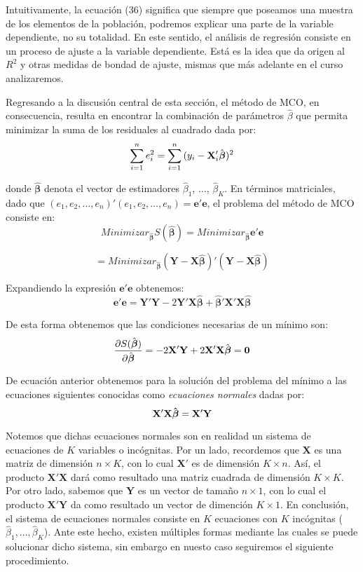 \documentclass[
  a4paper,
]{article}
\begin{document}
Intuitivamente, la ecuación (36) significa que siempre que poseamos una
muestra de los elementos de la población, podremos explicar una parte de
la variable dependiente, no su totalidad. En este sentido, el análisis
de regresión consiste en un proceso de ajuste a la variable dependiente.
Está es la idea que da origen al \(R^2\) y otras medidas de bondad de
ajuste, mismas que más adelante en el curso analizaremos.

Regresando a la discusión central de esta sección, el método de MCO, en
consecuencia, resulta en encontrar la combinación de parámetros
\(\hat\beta\) que permita minimizar la suma de los residuales al
cuadrado dada por: \[
\sum^{n}_{i=1}{e^2_i} = \sum^{n}_{i=1}{(y_i - {\bf X}'_i\hat{\boldsymbol{\beta}})^2}
\]

donde \(\hat{\boldsymbol{\beta}}\) denota el vector de estimadores
\(\hat{\beta}_1\), \(\ldots\), \(\hat{\beta}_K\). En términos
matriciales, dado que
\((e_1, e_2, \ldots, e_n)'(e_1, e_2, \ldots, e_n) = {\mathbf{e'e}}\), el
problema del método de MCO consiste en: \[
Minimizar_{\hat{\boldsymbol \beta}} S(\hat{\boldsymbol \beta}) = Minimizar_{\hat{\boldsymbol \beta}} \mathbf{e'e} 
\]

\[
= Minimizar_{\hat{\boldsymbol \beta}} (\mathbf{Y}-\mathbf{X}\hat{\boldsymbol \beta})'(\mathbf{Y}-\mathbf{X}\hat{\boldsymbol \beta})
\]

Expandiendo la expresión \(\mathbf{e'e}\) obtenemos: \[
\mathbf{e'e} = \mathbf{Y'Y} - 2 \mathbf{Y'X} \hat{\boldsymbol \beta} + \hat{\boldsymbol \beta}' \mathbf{X'X}\hat{\boldsymbol \beta}
\]

De esta forma obtenemos que las condiciones necesarias de un mínimo son:
\[
\frac{\partial S(\hat{\boldsymbol \beta})}{\partial \hat{\boldsymbol \beta}} = -2{\bf{X'Y}} + 2{\bf{X'X}} \hat{\boldsymbol{\beta}} = \bf{0}
\]

De ecuación anterior obtenemos para la solución del problema del mínimo
a las ecuaciones siguientes conocidas como \textit{ecuaciones normales}
dadas por: \[
\bf{X'X}\hat{\boldsymbol \beta} = \bf{X'Y}
\]

Notemos que dichas ecuaciones normales son en realidad un sistema de
ecuaciones de \(K\) variables o incógnitas. Por un lado, recordemos que
\(\mathbf X\) es una matriz de dimensión \(n \times K\), con lo cual
\(\mathbf X'\) es de dimensión \(K \times n\). Así, el producto
\(\mathbf{X'X}\) dará como resultado una matriz cuadrada de dimensión
\(K \times K\). Por otro lado, sabemos que \(\mathbf Y\) es un vector de
tamaño \(n \times 1\), con lo cual el producto \(\mathbf{X'Y}\) da como
resultado un vector de dimención \(K \times 1\). En conclusión, el
sistema de ecuaciones normales consiste en \(K\) ecuaciones con \(K\)
incógnitas (\(\hat{\beta}_1, \ldots, \hat{\beta}_K\)). Ante este hecho,
existen múltiples formas mediante las cuales se puede solucionar dicho
sistema, sin embargo en nuesto caso seguiremos el siguiente
procedimiento.
\end{document}
